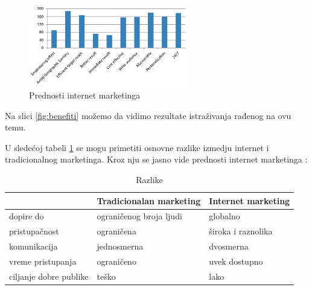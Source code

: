 \documentclass[a4paper]{article}
\begin{document}
{\begin{figure}[h!]
\begin{center}
\includegraphics[width=7cm]{slika.prednosti.marketinga.jpg}
\end{center}
\caption{Prednosti internet marketinga}
\label{fig:prednosti}
\end{figure}
{Na slici \ref{fig:benefiti} možemo da vidimo rezultate istraživanja rađenog na ovu temu. }

U slede\'{c}oj tabeli \ref{tab:tabela1}  se mogu primetiti osnovne razlike izmedju internet i tradicionalnog marketinga. Kroz nju se jasno vide prednosti internet marketinga :
\newpage
\begin{table}[h!]
\begin{center}
\caption{Razlike}
\begin{tabular}{|p{2cm}|p{3.1cm}|p{3.1cm}|} \hline
     &\centering Tradicionalan marketing& Internet marketing\\ \hline
 \centering dopire do& ograničenog broja \centering ljudi & globalno\\   \hline
\centering pristupačnost & ograničena& široka i raznolika\\ \hline
\centering komunikacija & jednosmerna& dvosmerna\\\hline
 \centering vreme pristupanja& ograničeno& uvek dostupno \\ \hline
\centering ciljanje dobre  publike &  teško &  lako  \\ \hline
\end{tabular}
\label{tab:tabela1}
\end{center}
\end{table}



}
\end{document}
